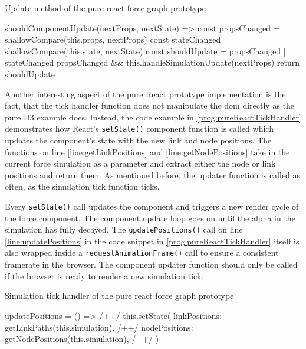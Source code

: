 \begin{program}
\caption{Update method of the pure react force graph prototype}
\label{prog:pureReactSimulationUpdate}
\begin{JsCode}
shouldComponentUpdate(nextProps, nextState) => {
  const propsChanged = shallowCompare(this.props, nextProps)
  const stateChanged = shallowCompare(this.state, nextState)
  const shouldUpdate = propsChanged || stateChanged
  propsChanged && this.handleSimulationUpdate(nextProps)
  return shouldUpdate
}
\end{JsCode}
\end{program}

Another interesting aspect of the pure React prototype implementation is the fact, that the tick handler function does not manipulate the dom directly as the pure D3 example does. Instead, the code example in \ref{prog:pureReactTickHandler} demonstrates how React's \texttt{setState()} component function is called which updates the component's state with the new link and node positions. The functions on line \ref{line:getLinkPositions} and \ref{line:getNodePositions} take in the current force simulation as a parameter and extract either the node or link positions and return them. As mentioned before, the updater function is called as often, as the simulation tick function ticks. 

Every \texttt{setState()} call updates the component and triggers a new render cycle of the force component. The component update loop goes on until the alpha in the simulation has fully decayed. The \texttt{updatePositions()} call on line \ref{line:updatePositions} in the code snippet in \ref{prog:pureReactTickHandler} itself is also wrapped inside a \texttt{requestAnimationFrame()} call to ensure a consistent framerate in the browser. The component updater function should only be called if the browser is ready to render a new simulation tick.

\begin{program}
\caption{Simulation tick handler of the pure react force graph prototype}
\label{prog:pureReactTickHandler}
\begin{JsCode}
updatePositions = () => { /+\label{line:updatePositions}+/
  this.setState({
    linkPositions: getLinkPaths(this.simulation), /+\label{line:getLinkPositions}+/
    nodePositions: getNodePositions(this.simulation), /+\label{line:getNodePositions}+/
  })
}
\end{JsCode}
\end{program}

